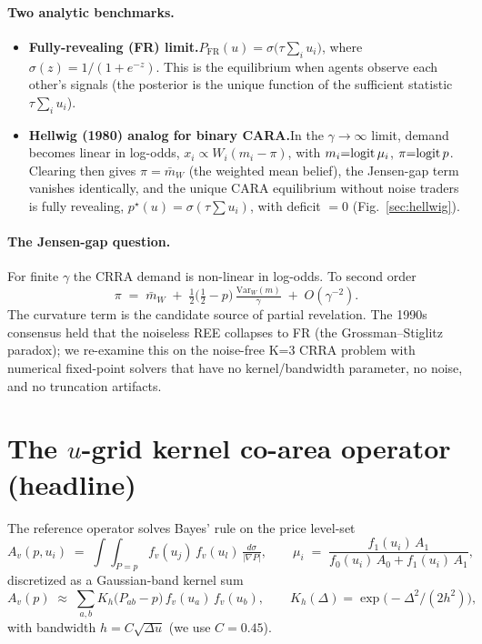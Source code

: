 \documentclass[11pt]{article}
\begin{document}
\paragraph{Two analytic benchmarks.}
\begin{itemize}
\item \textbf{Fully-revealing (FR) limit.}\quad $P_\mathrm{FR}(u) = \sigma\!\big(\tau\sum_i u_i\big)$, where
$\sigma(z)=1/(1+e^{-z})$. This is the equilibrium when agents observe each other's signals (the
posterior is the unique function of the sufficient statistic $\tau\sum_i u_i$).
\item \textbf{Hellwig (1980) analog for binary CARA.}\quad In the $\gamma\to\infty$ limit, demand
becomes linear in log-odds, $x_i\propto W_i(m_i-\pi)$, with $m_i{=}{\rm logit}\,\mu_i$, $\pi{=}{\rm logit}\,p$.
Clearing then gives $\pi = \bar m_W$ (the weighted mean belief), the Jensen-gap term vanishes
identically, and the unique CARA equilibrium without noise traders is fully revealing,
$p^\star(u)=\sigma(\tau\sum u_i)$, with deficit $=0$ (Fig.~\ref{sec:hellwig}).
\end{itemize}

\paragraph{The Jensen-gap question.}
For finite $\gamma$ the CRRA demand is non-linear in log-odds. To second order
\[
\pi \;=\; \bar m_W \;+\; \tfrac{1}{2}\bigl(\tfrac12 - p\bigr)\,\tfrac{\mathrm{Var}_W(m)}{\gamma}\;+\;O(\gamma^{-2}).
\]
The curvature term is the candidate source of partial revelation. The 1990s consensus held that
the noiseless REE collapses to FR (the Grossman–Stiglitz paradox); we re-examine this on the
noise-free K{=}3 CRRA problem with numerical fixed-point solvers that have no kernel/bandwidth
parameter, no noise, and no truncation artifacts.

\section{The $u$-grid kernel co-area operator (headline)}\label{sec:ugrid}

The reference operator solves Bayes' rule on the price level-set
\[
A_v(p,u_i) \;=\; \int\!\!\!\int_{P=p} f_v(u_j)\,f_v(u_l)\, \tfrac{d\sigma}{|\nabla P|},
\qquad \mu_i \;=\; \frac{f_1(u_i)\,A_1}{f_0(u_i)\,A_0 + f_1(u_i)\,A_1},
\]
discretized as a Gaussian-band kernel sum
\[
A_v(p) \;\approx\; \sum_{a,b} K_h\!\big(P_{ab}-p\big)\,f_v(u_a)\,f_v(u_b),
\qquad K_h(\Delta) = \exp\!\big({-}\Delta^2/(2h^2)\big),
\]
with bandwidth $h{=}C\sqrt{\Delta u}$ (we use $C{=}0.45$).
\end{document}
